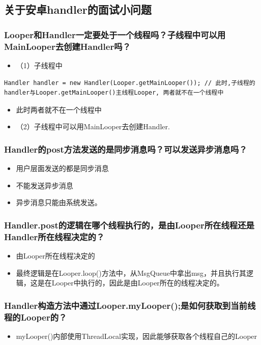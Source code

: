 \documentclass[9pt, b5paper]{article}
\begin{document}
\subsection{关于安卓handler的面试小问题}
\label{sec-2-2}
\subsubsection{Looper和Handler一定要处于一个线程吗？子线程中可以用MainLooper去创建Handler吗？}
\label{sec-2-2-1}
\begin{itemize}
\item （1）子线程中
\end{itemize}
\begin{verbatim}
Handler handler = new Handler(Looper.getMainLooper()); // 此时,子线程的handler与Looper.getMainLooper()主线程Looper, 两者就不在一个线程中
\end{verbatim}
\begin{itemize}
\item 此时两者就不在一个线程中
\item （2）子线程中可以用MainLooper去创建Handler.
\end{itemize}
\subsubsection{Handler的post方法发送的是同步消息吗？可以发送异步消息吗？}
\label{sec-2-2-2}
\begin{itemize}
\item 用户层面发送的都是同步消息
\item 不能发送异步消息
\item 异步消息只能由系统发送。
\end{itemize}
\subsubsection{Handler.post的逻辑在哪个线程执行的，是由Looper所在线程还是Handler所在线程决定的？}
\label{sec-2-2-3}
\begin{itemize}
\item 由Looper所在线程决定的
\item 最终逻辑是在Looper.loop()方法中，从MsgQueue中拿出msg，并且执行其逻辑，这是在Looper中执行的，因此是由Looper所在的线程决定的。
\end{itemize}
\subsubsection{Handler构造方法中通过Looper.myLooper();是如何获取到当前线程的Looper的？}
\label{sec-2-2-4}
\begin{itemize}
\item myLooper()内部使用ThreadLocal实现，因此能够获取各个线程自己的Looper
\end{itemize}
\end{document}
